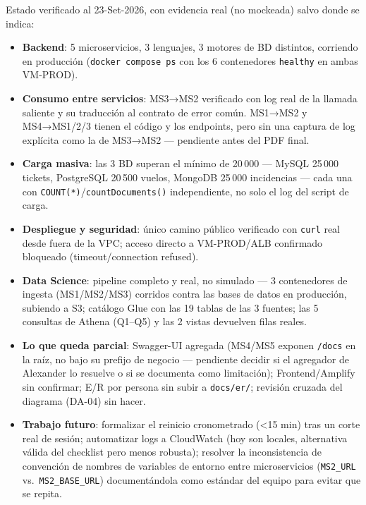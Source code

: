 Estado verificado al 23-Set-2026, con evidencia real (no mockeada) salvo donde se indica:

\begin{itemize}
\item \textbf{Backend}: 5 microservicios, 3 lenguajes, 3 motores de BD distintos, corriendo en
  producción (\texttt{docker compose ps} con los 6 contenedores \texttt{healthy} en ambas VM-PROD).
\item \textbf{Consumo entre servicios}: MS3→MS2 verificado con log real de la llamada saliente y su
  traducción al contrato de error común. MS1→MS2 y MS4→MS1/2/3 tienen el código y los endpoints, pero
  sin una captura de log explícita como la de MS3→MS2 — pendiente antes del PDF final.
\item \textbf{Carga masiva}: las 3 BD superan el mínimo de 20\,000 — MySQL 25\,000 tickets, PostgreSQL
  20\,500 vuelos, MongoDB 25\,000 incidencias — cada una con \texttt{COUNT(*)}/\texttt{countDocuments()}
  independiente, no solo el log del script de carga.
\item \textbf{Despliegue y seguridad}: único camino público verificado con \texttt{curl} real desde
  fuera de la VPC; acceso directo a VM-PROD/ALB confirmado bloqueado (timeout/connection refused).
\item \textbf{Data Science}: pipeline completo y real, no simulado — 3 contenedores de ingesta
  (MS1/MS2/MS3) corridos contra las bases de datos en producción, subiendo a S3; catálogo Glue con las
  19 tablas de las 3 fuentes; las 5 consultas de Athena (Q1–Q5) y las 2 vistas devuelven filas reales.
\item \textbf{Lo que queda parcial}: Swagger-UI agregada (MS4/MS5 exponen \texttt{/docs} en la raíz, no
  bajo su prefijo de negocio — pendiente decidir si el agregador de Alexander lo resuelve o si se
  documenta como limitación); Frontend/Amplify sin confirmar; E/R por persona sin subir a
  \texttt{docs/er/}; revisión cruzada del diagrama (DA-04) sin hacer.
\item \textbf{Trabajo futuro}: formalizar el reinicio cronometrado (<15 min) tras un corte real de
  sesión; automatizar logs a CloudWatch (hoy son locales, alternativa válida del checklist pero menos
  robusta); resolver la inconsistencia de convención de nombres de variables de entorno entre
  microservicios (\texttt{MS2\_URL} vs.\ \texttt{MS2\_BASE\_URL}) documentándola como estándar del
  equipo para evitar que se repita.
\end{itemize}
